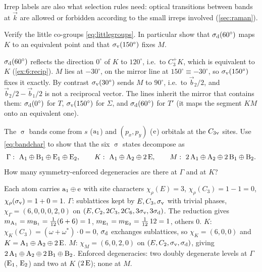 Irrep labels are also what selection rules need: optical transitions between bands at
$\vec{k}$ are allowed or forbidden according to the small irreps involved
(\cref{sec:raman}).

\exercisesection

\begin{exercise}\label{ex:7:littlegroups}
Verify the little co-groups \eqref{eq:littlegroups}. In particular show that
$\sigma_{\mathrm{d}}(60^\circ)$ maps $K$ to an equivalent point and that $\sigma_{\mathrm{v}}(150^\circ)$ fixes $M$.
\end{exercise}

\begin{solution}
$\sigma_{\mathrm{d}}(60^\circ)$ reflects the direction $0^\circ$ of $K$ to $120^\circ$, i.e.\ to $C_3^+K$,
which is equivalent to $K$ (\cref{ex:6:recip}). $M$ lies at $-30^\circ$, on the mirror line
at $150^\circ\equiv-30^\circ$, so $\sigma_{\mathrm{v}}(150^\circ)$ fixes it exactly. By contrast
$\sigma_{\mathrm{v}}(30^\circ)$ sends $M$ to $90^\circ$, i.e.\ to $\vec{b}_2/2$, and
$\vec{b}_2/2-\vec{b}_1/2$ is not a reciprocal vector. The lines inherit the mirror that
contains them: $\sigma_{\mathrm{d}}(0^\circ)$ for $T$, $\sigma_{\mathrm{v}}(150^\circ)$ for $\Sigma$, and $\sigma_{\mathrm{d}}(60^\circ)$
for $T'$ (it maps the segment $KM$ onto an equivalent one).
\end{solution}

\begin{exercise}\label{ex:7:sigma}
The $\upsigma$ bands come from $s$ ($\mathrm{a}_1$) and $(p_x,p_y)$ ($\mathrm{e}$) orbitals at the
$C_{3\mathrm{v}}$ sites. Use \eqref{eq:bandchar} to show that the six $\upsigma$ states decompose as
\[
\Gamma:\ \irr{A}_1\oplus\irr{B}_1\oplus\irr{E}_1\oplus\irr{E}_2,\qquad
K:\ \irr{A}_1\oplus\irr{A}_2\oplus2\,\irr{E},\qquad
M:\ 2\,\irr{A}_1\oplus\irr{A}_2\oplus2\,\irr{B}_1\oplus\irr{B}_2 .
\]
How many symmetry-enforced degeneracies are there at $\Gamma$ and at $K$?
\end{exercise}

\begin{solution}
Each atom carries $\mathrm{a}_1\oplus\mathrm{e}$ with site characters
$\chi_\rho(E)=3$, $\chi_\rho(C_3)=1-1=0$, $\chi_\rho(\sigma_{\mathrm{v}})=1+0=1$.
$\Gamma$: sublattices kept by $E,C_3,\sigma_{\mathrm{v}}$ with trivial phases,
$\chi_\Gamma=(6,0,0,0,2,0)$ on $(E,C_2,2C_3,2C_6,3\sigma_{\mathrm{v}},3\sigma_{\mathrm{d}})$. The reduction gives
$m_{\mathrm{A}_1}=m_{\mathrm{B}_1}=\tfrac1{12}(6+6)=1$, $m_{\mathrm{E}_1}=m_{\mathrm{E}_2}=\tfrac1{12}\,12=1$,
others $0$.
$K$: $\chi_K(C_3)=(\omega+\omega^{*})\cdot0=0$, $\sigma_{\mathrm{d}}$ exchanges sublattices, so
$\chi_K=(6,0,0)$ and $K=\mathrm{A}_1\oplus\mathrm{A}_2\oplus2\,\mathrm{E}$.
$M$: $\chi_M=(6,0,2,0)$ on $(E,C_2,\sigma_{\mathrm{v}},\sigma_{\mathrm{d}})$, giving
$2\,\mathrm{A}_1\oplus\mathrm{A}_2\oplus2\,\mathrm{B}_1\oplus\mathrm{B}_2$.
Enforced degeneracies: two doubly degenerate levels at $\Gamma$ ($\mathrm{E}_1$, $\mathrm{E}_2$) and
two at $K$ ($2\,\mathrm{E}$); none at $M$.
\end{solution}

